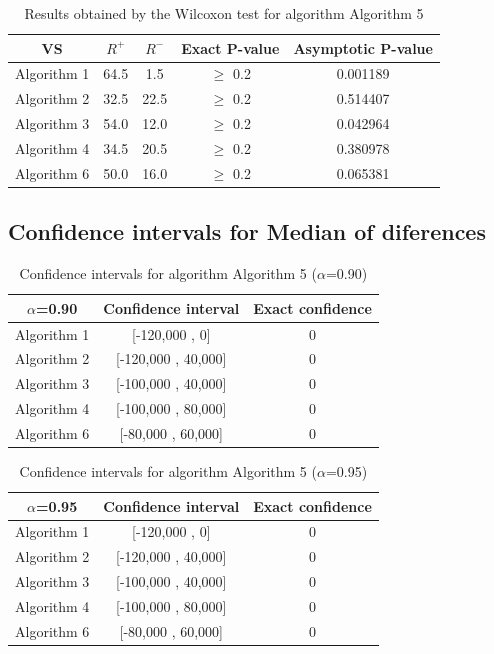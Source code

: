 \documentclass[a4paper,10pt]{article}
\begin{document}
\begin{table}[!htp]
\centering\small
\begin{tabular}{
|c|c|c|c|c|}
\hline
 VS & $R^{+}$ & $R^{-}$ & Exact P-value & Asymptotic P-value \\ \hline 
Algorithm 1 & 64.5 & 1.5 & $\geq$ 0.2 & 0.001189\\ \hline 
Algorithm 2 & 32.5 & 22.5 & $\geq$ 0.2 & 0.514407\\ \hline 
Algorithm 3 & 54.0 & 12.0 & $\geq$ 0.2 & 0.042964\\ \hline 
Algorithm 4 & 34.5 & 20.5 & $\geq$ 0.2 & 0.380978\\ \hline 
Algorithm 6 & 50.0 & 16.0 & $\geq$ 0.2 & 0.065381\\ \hline 

\end{tabular}
\caption{Results obtained by the Wilcoxon test for algorithm Algorithm 5}
\end{table}

\subsection{Confidence intervals for Median of diferences}

\begin{table}[!htp]
\centering\small
\begin{tabular}{
|c|c|c|}
\hline
 $\alpha$=0.90 & Confidence interval & Exact confidence \\ \hline 
Algorithm 1 & [-120,000 , 0] & 0\\ \hline 
Algorithm 2 & [-120,000 , 40,000] & 0\\ \hline 
Algorithm 3 & [-100,000 , 40,000] & 0\\ \hline 
Algorithm 4 & [-100,000 , 80,000] & 0\\ \hline 
Algorithm 6 & [-80,000 , 60,000] & 0\\ \hline 

\end{tabular}
\caption{Confidence intervals for algorithm Algorithm 5 ($\alpha$=0.90)}
\end{table}
\begin{table}[!htp]
\centering\small
\begin{tabular}{
|c|c|c|}
\hline
 $\alpha$=0.95 & Confidence interval & Exact confidence \\ \hline 
Algorithm 1 & [-120,000 , 0] & 0\\ \hline 
Algorithm 2 & [-120,000 , 40,000] & 0\\ \hline 
Algorithm 3 & [-100,000 , 40,000] & 0\\ \hline 
Algorithm 4 & [-100,000 , 80,000] & 0\\ \hline 
Algorithm 6 & [-80,000 , 60,000] & 0\\ \hline 

\end{tabular}
\caption{Confidence intervals for algorithm Algorithm 5 ($\alpha$=0.95)}
\end{table}
\end{document}
